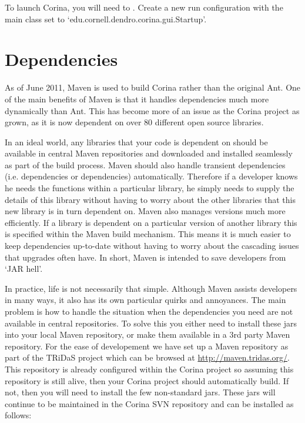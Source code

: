 To launch Corina, you will need to .  Create a new run configuration with the main class set to `edu.cornell.dendro.corina.gui.Startup'.     


\section{Dependencies}
\label{txt:DependenciesDesktopClient}
As of June 2011, Maven is used to build Corina rather than the original Ant.  One of the main benefits of Maven is that it handles dependencies much more dynamically than Ant.  This has become more of an issue as the Corina project as grown, as it is now dependent on over 80 different open source libraries.  

In an ideal world, any libraries that your code is dependent on should be available in central Maven repositories and downloaded and installed seamlessly as part of the build process.  Maven should also handle transient dependencies (i.e. dependencies or dependencies) automatically.  Therefore if a developer knows he needs the functions within a particular library, he simply needs to supply the details of this library without having to worry about the other libraries that this new library is in turn dependent on.  Maven also manages versions much more efficiently.  If a library is dependent on a particular version of another library this is specified within the Maven build mechanism.  This means it is much easier to keep dependencies up-to-date without having to worry about the cascading issues that upgrades often have.  In short, Maven is intended to save developers from `JAR hell'.

In practice, life is not necessarily that simple.  Although Maven assists developers in many ways, it also has its own particular quirks and annoyances.  The main problem is how to handle the situation when the dependencies you need are not available in central repositories.  To solve this you either need to install these jars into your local Maven repository, or make them available in a 3rd party Maven repository.  For the ease of developement we have set up a Maven repository as part of the TRiDaS project which can be browsed at \url{http://maven.tridas.org/}.  This repository is already configured within the Corina project so assuming this repository is still alive, then your Corina project should automatically build.  If not, then you will need to install the few non-standard jars.  These jars will continue to be maintained in the Corina SVN repository and can be installed as follows:

